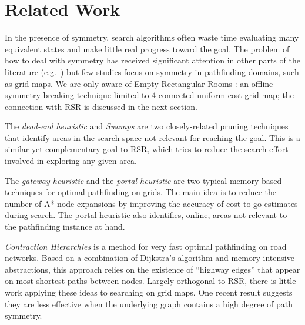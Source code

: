 \section{Related Work}
\label{sec:relatedwork}
In the presence of symmetry, search algorithms often waste time evaluating many
equivalent states and make little real progress toward the goal.  The problem of
how to deal with symmetry has received significant attention in other parts of
the literature (e.g.~\cite{rossi06}) but few studies focus on symmetry in
pathfinding domains, such as grid maps.  We are only aware of Empty Rectangular
Rooms \cite{harabor10}: an offline symmetry-breaking technique limited to
4-connected uniform-cost grid map; the connection with RSR is discussed in the
next section.
\par
The \emph{dead-end heuristic} \cite{bjornsson06} and \emph{Swamps} \cite{pochter10} 
are two closely-related pruning techniques
that identify areas in the search space not relevant for reaching the goal. 
This is a similar yet complementary goal
to RSR, which tries to reduce the search effort involved in exploring any given
area. 
\par
The \emph{gateway heuristic} \cite{bjornsson06} and the \emph{portal heuristic}
\cite{goldenberg10} are two typical memory-based techniques for optimal 
pathfinding on grids. 
The main idea is to reduce the number of
A* node expansions by improving the accuracy of cost-to-go estimates during
search.  The portal heuristic also identifies, online, areas
not relevant to the pathfinding instance at hand.
\par
\emph{Contraction Hierarchies} \cite{geisberger08} is a method for
very fast optimal pathfinding on road networks. 
Based on a combination of Dijkstra's algorithm and memory-intensive
abstractions, this approach relies on the existence of ``highway edges'' that appear
on most shortest paths between nodes.
Largely orthogonal to RSR, there is little work applying these ideas to searching on grid maps.
One recent result \cite{sturtevant10} suggests they are less effective when the 
underlying graph contains a high degree of path
symmetry.
